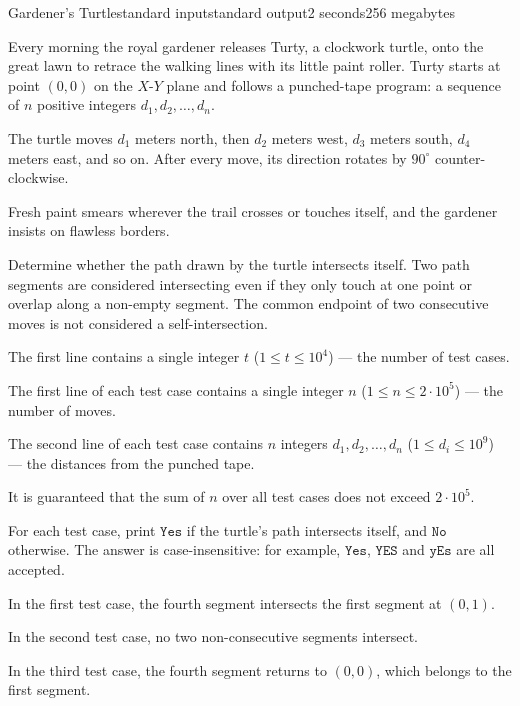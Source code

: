 \begin{problem}{Gardener's Turtle}{standard input}{standard output}{2 seconds}{256 megabytes}

Every morning the royal gardener releases Turty, a clockwork turtle, onto the great lawn to retrace the walking lines with its little paint roller. Turty starts at point $(0, 0)$ on the $X$-$Y$ plane and follows a punched-tape program: a sequence of $n$ positive integers $d_1, d_2, \ldots, d_n$.

The turtle moves $d_1$ meters north, then $d_2$ meters west, $d_3$ meters south, $d_4$ meters east, and so on. After every move, its direction rotates by $90^\circ$ counter-clockwise.

Fresh paint smears wherever the trail crosses or touches itself, and the gardener insists on flawless borders.

Determine whether the path drawn by the turtle intersects itself. Two path segments are considered intersecting even if they only touch at one point or overlap along a non-empty segment. The common endpoint of two consecutive moves is not considered a self-intersection.


\InputFile
The first line contains a single integer $t$ ($1 \le t \le 10^4$) --- the number of test cases.

The first line of each test case contains a single integer $n$ ($1 \le n \le 2 \cdot 10^5$) --- the number of moves.

The second line of each test case contains $n$ integers $d_1, d_2, \ldots, d_n$ ($1 \le d_i \le 10^9$) --- the distances from the punched tape.

It is guaranteed that the sum of $n$ over all test cases does not exceed $2 \cdot 10^5$.


\OutputFile
For each test case, print $\texttt{Yes}$ if the turtle's path intersects itself, and $\texttt{No}$ otherwise. The answer is case-insensitive: for example, $\texttt{Yes}$, $\texttt{YES}$ and $\texttt{yEs}$ are all accepted.


\Example

\begin{example}
%
\end{example}

\Note
In the first test case, the fourth segment intersects the first segment at $(0,1)$.

In the second test case, no two non-consecutive segments intersect.

In the third test case, the fourth segment returns to $(0,0)$, which belongs to the first segment.


\end{problem}

